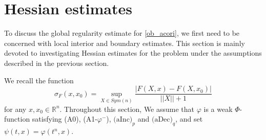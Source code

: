 \documentclass[11pt, reqno]{amsart}
\numberwithin{equation}{section}
\begin{document}
\section{Hessian estimates}
To discuss the global regularity estimate for \eqref{ob_acori}, we first need to be concerned with local interior and boundary estimates. 
This section is mainly devoted to investigating Hessian estimates for the problem
 under the assumptions described in the previous section.

We recall the function
$$ \sigma_{F}(x,x_{0}) = \sup_{X \in Sym(n)} \frac{|F(X,x)-F(X,x_{0})|}{||X||+1}$$
for any $x, x_{0} \in \mathbb{R}^n$.
Throughout this section, %
We assume that $\varphi$ is a weak $\Phi$-function satisfying (A0), (A1-$\varphi^{-}$), $\textrm{(aInc)}_{p}$ and $\textrm{(aDec)}_{q}$, and set $\psi(t,x)=\varphi(t^{n},x)$.
\end{document}
